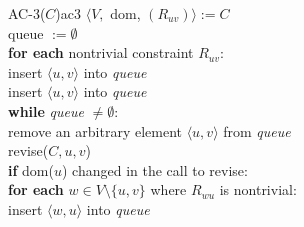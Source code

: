 \begin{function}{AC-3($C$)}{ac3}
	$\langle V,$ dom, $(R_{uv})\rangle := C$ \\
	queue $:= \emptyset$ \\
	\textbf{for each} nontrivial constraint $R_{uv}$: \\
	\null \qquad  insert $\langle u, v \rangle$ into \textit{queue} \\
	\null \qquad  insert $\langle u, v \rangle$ into \textit{queue} \\

	\textbf{while} \textit{queue} $\neq \emptyset$: \\
	\null \qquad  remove an arbitrary element $\langle u, v \rangle$ from \textit{queue} \\
	\null \qquad  revise($C, u, v$) \\
	\null \qquad  \textbf{if} dom($u$) changed in the call to revise: \\
	\null \qquad \qquad  \textbf{for each} $w \in V \setminus \{u,v\}$ where $R_{wu}$ is nontrivial: \\
	\null \qquad \qquad \qquad  insert $\langle w, u \rangle$ into \textit{queue}
\end{function}

